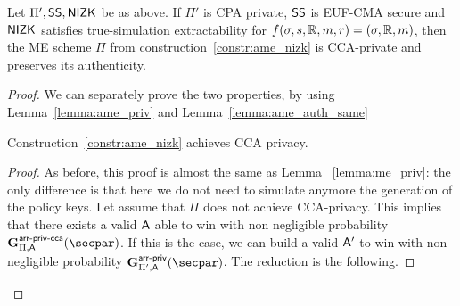 \begin{theorem}\label{theo:ame_nizk_priv}
    Let $\Pi', \mathsf{SS}, \mathsf{NIZK}$ be as above.
    If $\Pi'$ is CPA private, $\mathsf{SS}$ is EUF-CMA secure and $\mathsf{NIZK}$ satisfies true-simulation extractability for $f(\sigma, s, \mathbb{R}, m, r) = (\sigma, \mathbb{R}, m)$, then the ME scheme $\Pi$ from construction~\ref{constr:ame_nizk} is CCA-private and preserves its authenticity.
\end{theorem}

\begin{proof}
    We can separately prove the two properties, by using Lemma~\ref{lemma:ame_priv} and Lemma~\ref{lemma:ame_auth_same}


    \begin{lemma}\label{lemma:ame_priv}
        Construction~\ref{constr:ame_nizk} achieves CCA privacy.
        \begin{proof}
            As before, this proof is almost the same as Lemma ~\ref{lemma:me_priv}: the only difference is that here we do not need to simulate anymore the generation of the policy keys.
            Let assume that $\Pi$ does not achieve CCA-privacy. This implies that there exists a valid $\mathsf{A}$ able to win with non negligible probability $\NISHmatchgamecca{\arranged}_{\Pi, \adversary}(\secpar)$. If this is the case, we can build a valid $\mathsf{A}'$ to win with non negligible probability $\NISHmatchgame{\arranged}_{\Pi', \adversary}(\secpar)$. The reduction is the following.


\end{proof}
\end{lemma}
\end{proof}
